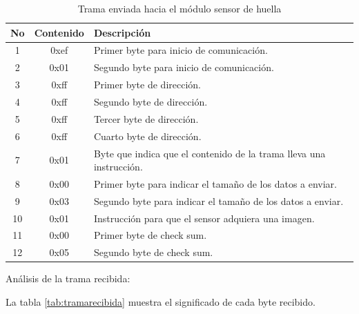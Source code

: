 \begin{table}[h]
	\centering
	\caption[Resultado trama de envío]{Trama enviada hacia el módulo sensor de huella}
	\begin{tabular}{c c l}    
		\toprule
		\textbf{No}  & \textbf{Contenido}  & \textbf{Descripción}\\
		\midrule
		1	 	& 0xef 	& Primer byte para inicio de comunicación.\\		
		2	 	& 0x01 	& Segundo byte para inicio de comunicación.\\
		3 		& 0xff & Primer byte de dirección.\\	
		4	 	& 0xff 	& Segundo byte de dirección.\\
		5	 	& 0xff 	& Tercer byte de dirección.\\
		6	 	& 0xff 	& Cuarto byte de dirección.\\
		7	 	& 0x01 	& Byte que indica que el contenido de la trama lleva una instrucción.\\
		8	 	& 0x00 	& Primer byte para indicar el tamaño de los datos a enviar.\\				
		9	 	& 0x03 	& Segundo byte para indicar el tamaño de los datos a enviar.\\	
		10	 	& 0x01 	& Instrucción para que el sensor adquiera una imagen.\\	
		11	 	& 0x00 	& Primer byte de check sum.\\	
		12	 	& 0x05 	& Segundo byte de check sum.\\				
		\bottomrule
		\hline
	\end{tabular}
	\label{tab:tramaenvio}
\end{table}

Análisis de la trama recibida:

La tabla \ref{tab:tramarecibida} muestra el significado de cada byte recibido.

